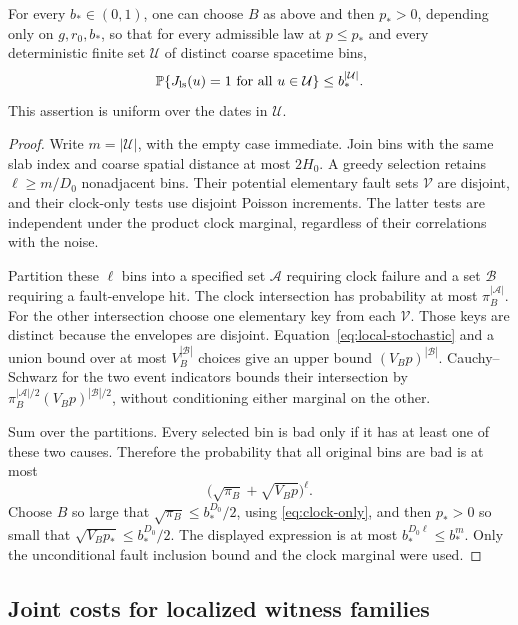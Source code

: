 \begin{lemma}\label{lem:joint-bins}
For every \(b_*\in(0,1)\), one can choose \(B\) as above and then
\(p_*>0\), depending only on \(g,r_0,b_*\), so that for every
admissible law at \(p\le p_*\) and every deterministic finite
set \(\mathcal U\) of distinct coarse spacetime bins,
\begin{equation}\label{eq:joint-bins}
 \mathbb P\{J_{\rm ls}(u)=1\text{ for all }u\in\mathcal U\}
       \le b_*^{|\mathcal U|}.
\end{equation}
This assertion is uniform over the dates in \(\mathcal U\).
\end{lemma}
\begin{proof}
Write \(m=|\mathcal U|\), with the empty case immediate.
Join bins with the same slab index and coarse spatial distance
at most \(2H_0\). A greedy selection retains
\(\ell\ge m/D_0\) nonadjacent bins. Their potential elementary
fault sets \(\mathcal V\) are disjoint, and their clock-only
tests use disjoint Poisson increments. The latter tests are
independent under the product clock marginal, regardless of
their correlations with the noise.

Partition these \(\ell\) bins into a specified set
\(\mathcal A\) requiring clock failure and a set \(\mathcal B\)
requiring a fault-envelope hit. The clock intersection has
probability at most \(\pi_B^{|\mathcal A|}\).
For the other intersection choose one elementary key from each
\(\mathcal V\). Those keys are distinct because the envelopes
are disjoint. Equation~\eqref{eq:local-stochastic} and a union
bound over at most \(V_B^{|\mathcal B|}\) choices give an upper
bound \((V_Bp)^{|\mathcal B|}\).
Cauchy--Schwarz for the two event indicators bounds their
intersection by
\(\pi_B^{|\mathcal A|/2}(V_Bp)^{|\mathcal B|/2}\), without
conditioning either marginal on the other.

Sum over the partitions. Every selected bin is bad only if it
has at least one of these two causes. Therefore the probability
that all original bins are bad is at most
\[
 \bigl(\sqrt{\pi_B}+\sqrt{V_Bp}\bigr)^\ell.
\]
Choose \(B\) so large that
\(\sqrt{\pi_B}\le b_*^{D_0}/2\), using
\eqref{eq:clock-only}, and then \(p_*>0\) so small that
\(\sqrt{V_Bp_*}\le b_*^{D_0}/2\).
The displayed expression is at most
\(b_*^{D_0\ell}\le b_*^m\). Only the unconditional fault
inclusion bound and the clock marginal were used.
\end{proof}

\subsection{Joint costs for localized witness families}

